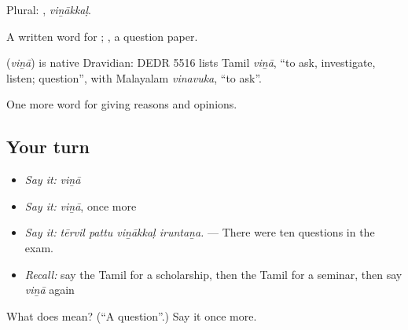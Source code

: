 Plural: , \emph{viṉākkaḷ}.

A written word for ; , a question paper.

\begin{cousinweb}
\textbf{} (\emph{viṉā}) is native Dravidian: DEDR 5516 lists Tamil \emph{viṉā}, \textquotedblleft{}to ask, investigate, listen; question\textquotedblright{}, with Malayalam \emph{vinavuka}, \textquotedblleft{}to ask\textquotedblright{}.
\end{cousinweb}

\begin{grammarlens}[title={What you've built}]
One more word for giving reasons and opinions.
\end{grammarlens}

\subsection*{Your turn}
\begin{itemize}
\raggedright
  \item \emph{Say it:} \emph{viṉā}
  \item \emph{Say it:} \emph{viṉā}, once more
  \item \emph{Say it:} \emph{tērvil pattu viṉākkaḷ iruntaṉa.} — There were ten questions in the exam.
  \item \emph{Recall:} say the Tamil for a scholarship, then the Tamil for a seminar, then say \emph{viṉā} again
\end{itemize}

\begin{tcolorbox}[breakable,colback=teal!4,colframe=teal!35!black,title={Before you move on}]
What does  mean? (\textquotedblleft{}A question\textquotedblright{}.) Say it once more.
\end{tcolorbox}
